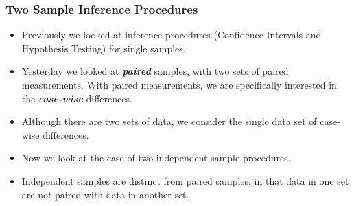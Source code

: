 
\begin{frame}
\frametitle{Two Sample Inference Procedures}
\begin{itemize}
\item Previously we looked at inference procedures (Confidence Intervals and Hypothesis Testing) for single samples.
\item Yesterday we looked at \textit{\textbf{paired}} samples, with two sets of paired measurements. With paired measurements, we are specifically interested in the \textbf{\textit{case-wise}} differences.
\item Although there are two sets of data, we consider the single data set of case-wise differences.
\item Now we look at the case of two independent sample procedures.
\item Independent samples are distinct from paired samples, in that data in one set are not paired with data in another set.
\end{itemize}
\end{frame}

